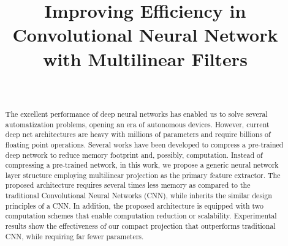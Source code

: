 \documentclass[conference,usletter]{IEEEtran}
\begin{document}
\title{Improving Efficiency in Convolutional Neural Network with Multilinear Filters}
\author{
\\

}

\maketitle

\begin{abstract}
The excellent performance of deep neural networks has enabled us to solve several automatization problems, opening an era of autonomous devices. However, current deep net architectures are heavy with millions of parameters and require billions of floating point operations. Several works have been developed to compress a pre-trained deep network to reduce memory footprint and, possibly, computation. Instead of compressing a pre-trained network, in this work, we propose a generic neural network layer structure employing multilinear projection as the primary feature extractor. The proposed architecture requires several times less memory as compared to the traditional Convolutional Neural Networks (CNN), while inherits the similar design principles of a CNN. In addition, the proposed architecture is equipped with two computation schemes that enable computation reduction or scalability. Experimental results show the effectiveness of our compact projection that outperforms traditional CNN, while requiring far fewer parameters.
\end{abstract}
\end{document}
